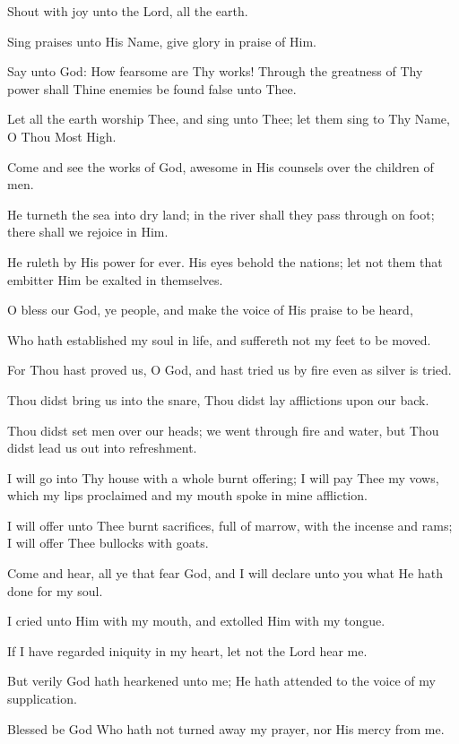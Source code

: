 Shout with joy unto the Lord, all the earth.

Sing praises unto His Name, give glory in praise of Him.

Say unto God: How fearsome are Thy works! Through the greatness of Thy power shall Thine enemies be found false unto Thee.

Let all the earth worship Thee, and sing unto Thee; let them sing to Thy Name, O Thou Most High.

Come and see the works of God, awesome in His counsels over the children of men.

He turneth the sea into dry land; in the river shall they pass through on foot; there shall we rejoice in Him.

He ruleth by His power for ever. His eyes behold the nations; let not them that embitter Him be exalted in themselves.

O bless our God, ye people, and make the voice of His praise to be heard,

Who hath established my soul in life, and suffereth not my feet to be moved.

For Thou hast proved us, O God, and hast tried us by fire even as silver is tried.

Thou didst bring us into the snare, Thou didst lay afflictions upon our back.

Thou didst set men over our heads; we went through fire and water, but Thou didst lead us out into refreshment.

I will go into Thy house with a whole burnt offering; I will pay Thee my vows, which my lips proclaimed and my mouth spoke in mine affliction.

I will offer unto Thee burnt sacrifices, full of marrow, with the incense and rams; I will offer Thee bullocks with goats.

Come and hear, all ye that fear God, and I will declare unto you what He hath done for my soul.

I cried unto Him with my mouth, and extolled Him with my tongue.

If I have regarded iniquity in my heart, let not the Lord hear me.

But verily God hath hearkened unto me; He hath attended to the voice of my supplication.

Blessed be God Who hath not turned away my prayer, nor His mercy from me.
